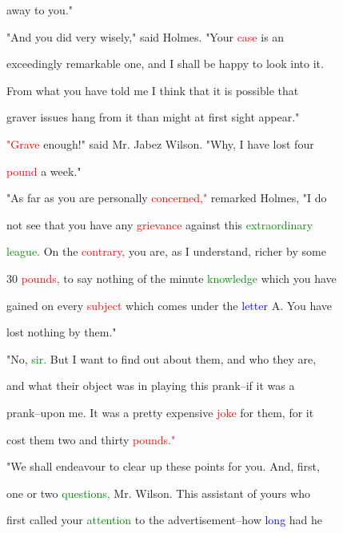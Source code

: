  away to you."



 "And you did very wisely," said Holmes. "Your \textcolor{red}{case} is an

 exceedingly \textcolor{BurntOrange}{remarkable} one, and I shall be \textcolor{BurntOrange}{happy} to look into it.

 From what you have told me I think that it is possible that

 graver issues hang from it than might at first sight appear."



 \textcolor{red}{"Grave} enough!" said Mr. Jabez Wilson. "Why, I have \textcolor{BurntOrange}{lost} four

 \textcolor{red}{pound} a week."



 "As far as you are personally \textcolor{red}{concerned,"} remarked Holmes, "I do

 not see that you have any \textcolor{red}{grievance} against this \textcolor{green}{extraordinary}

 \textcolor{green}{league.} On the \textcolor{red}{contrary,} you are, as I understand, richer by some

 30 \textcolor{red}{pounds,} to say nothing of the minute \textcolor{green}{knowledge} which you have

 \textcolor{BurntOrange}{gained} on every \textcolor{red}{subject} which comes under the \textcolor{blue}{letter} A. You have

 \textcolor{BurntOrange}{lost} nothing by them."



 "No, \textcolor{green}{sir.} But I want to find out about them, and who they are,

 and what their object was in playing this prank--if it was a

 prank--upon me. It was a \textcolor{BurntOrange}{pretty} expensive \textcolor{red}{joke} for them, for it

 cost them two and thirty \textcolor{red}{pounds."}



 "We shall endeavour to clear up these points for you. And, first,

 one or two \textcolor{green}{questions,} Mr. Wilson. This assistant of yours who

 first called your \textcolor{green}{attention} to the advertisement--how \textcolor{blue}{long} had he

